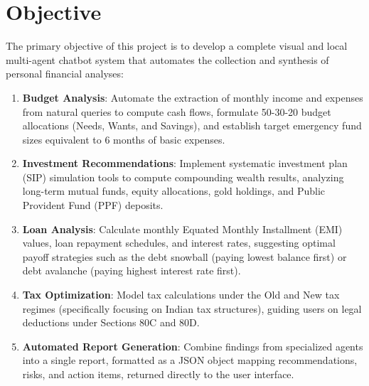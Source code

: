 \section{Objective}
The primary objective of this project is to develop a complete visual and local multi-agent chatbot system that automates the collection and synthesis of personal financial analyses:
\begin{enumerate}
    \item \textbf{Budget Analysis}: Automate the extraction of monthly income and expenses from natural queries to compute cash flows, formulate 50-30-20 budget allocations (Needs, Wants, and Savings), and establish target emergency fund sizes equivalent to 6 months of basic expenses.
    \item \textbf{Investment Recommendations}: Implement systematic investment plan (SIP) simulation tools to compute compounding wealth results, analyzing long-term mutual funds, equity allocations, gold holdings, and Public Provident Fund (PPF) deposits.
    \item \textbf{Loan Analysis}: Calculate monthly Equated Monthly Installment (EMI) values, loan repayment schedules, and interest rates, suggesting optimal payoff strategies such as the debt snowball (paying lowest balance first) or debt avalanche (paying highest interest rate first).
    \item \textbf{Tax Optimization}: Model tax calculations under the Old and New tax regimes (specifically focusing on Indian tax structures), guiding users on legal deductions under Sections 80C and 80D.
    \item \textbf{Automated Report Generation}: Combine findings from specialized agents into a single report, formatted as a JSON object mapping recommendations, risks, and action items, returned directly to the user interface.
\end{enumerate}

